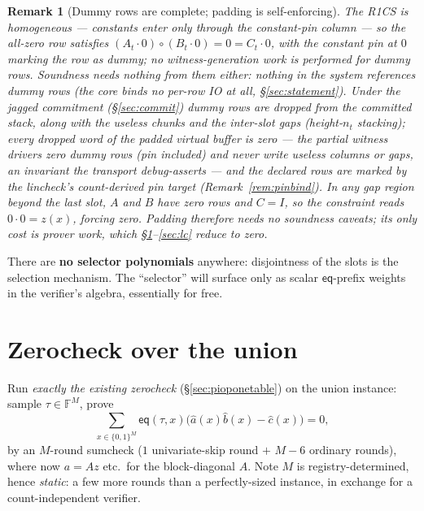 \documentclass[11pt]{article}
\newcommand{\F}{\mathbb{F}}                       %
\newcommand{\eq}{\mathsf{eq}}
\newtheorem{remark}{Remark}
\theoremstyle{definition}
\begin{document}
\begin{remark}[Dummy rows are complete; padding is self-enforcing]
\label{rem:padding}
The R1CS is homogeneous --- constants enter only through the constant-pin
column --- so the all-zero row satisfies
$(A_t \cdot 0)\circ(B_t \cdot 0) = 0 = C_t \cdot 0$, with the constant pin
at $0$ marking the row as dummy; no witness-generation work is performed
for dummy rows. Soundness needs nothing from them either: nothing in the
system references dummy rows (the core binds no per-row IO at all,
\S\ref{sec:statement}). Under the jagged commitment (\S\ref{sec:commit})
dummy rows are \emph{dropped} from the committed stack, along with the
useless chunks and the inter-slot gaps (height-$n_t$ stacking); every
dropped word of the padded virtual buffer is zero --- the partial witness
drivers zero dummy rows (pin included) and never write useless columns or
gaps, an invariant the transport debug-asserts --- and the declared rows
are marked by the lincheck's count-derived pin target
(Remark~\ref{rem:pinbind}). In any gap
region beyond the last slot, $A$ and $B$ have zero rows
and $C = I$, so the constraint reads $0 \cdot 0 = z(x)$, \emph{forcing}
zero. Padding therefore needs no soundness caveats; its only cost is
prover work, which \S\ref{sec:zc}--\ref{sec:lc} reduce to zero.
\end{remark}

There are \textbf{no selector polynomials} anywhere: disjointness of the
slots is the selection mechanism. The ``selector'' will surface only as
scalar $\eq$-prefix weights in the verifier's algebra, essentially for free.

\section{Zerocheck over the union}\label{sec:zc}

Run \emph{exactly the existing zerocheck} (\S\ref{sec:pioponetable}) on the
union instance: sample $\tau \in \F^{M}$, prove
\begin{equation}\label{eq:zc-union}
  \sum_{x \in \{0,1\}^{M}} \eq(\tau, x)
     \bigl(\hat a(x)\hat b(x) - \hat c(x)\bigr) = 0 ,
\end{equation}
by an $M$-round sumcheck ($1$ univariate-skip round $+$ $M - 6$ ordinary
rounds), where now $a = Az$ etc.\ for the block-diagonal $A$. Note $M$ is
registry-determined, hence \emph{static}: a few more rounds than a
perfectly-sized instance, in exchange for a count-independent verifier.
\end{document}
